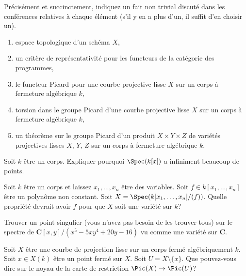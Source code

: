 \begin{exercise}[Theorems]
\label{exercise-results-spring-2025}
Précisément et succinctement, indiquez un fait non trivial discuté dans les conférences relatives
à chaque élément (s'il y en a plus d'un, il suffit d'en choisir un).
\begin{enumerate}
\item espace topologique d'un schéma $X$,
\item un critère de représentativité pour les functeurs de la catégorie des programmes,
\item le functeur Picard pour une courbe projective lisse $X$ sur un
corps à fermeture algébrique $k$,
\item torsion dans le groupe Picard d'une courbe projective lisse $X$ sur un
corps à fermeture algébrique $k$,
\item un théorème sur le groupe Picard d'un produit $X \times Y \times
Z$ de variétés projectives lisses $X$, $Y$, $Z$ sur un corps à
fermeture algébrique $k$.
\end{enumerate}
\end{exercise}

\begin{exercise}
\label{exercise-affine-line-infinite-nr-points}
Soit $k$ être un corps. Expliquer pourquoi $\Spec(k[x])$ a infiniment beaucoup de points.
\end{exercise}

\begin{exercise}
\label{exercise-hypersurface-variety}
Soit $k$ être un corps et laissez $x_1, \ldots, x_n$ être
des variables. Soit $f \in k[x_1, \ldots, x_n]$ être un polynôme
non constant. Soit $X = \Spec(k[x_1, \ldots, x_n]/(f))$. Quelle propriété
devrait avoir $f$ pour que $X$ soit une variété sur $k$?
\end{exercise}

\begin{exercise}
\label{exercise-find-singular-point}
Trouver un point singulier (vous n'avez pas besoin de les trouver
tous) sur le spectre de $\mathbf{C}[x, y]/(x^5 - 5xy^4 + 20y -
16)$ vu comme une variété sur $\mathbf{C}$.
\end{exercise}

\begin{exercise}
\label{exercise-kernel-restriction-pic-curve}
Soit $X$ être une courbe de projection lisse sur un corps fermé algébriquement
$k$. Soit $x \in X(k)$ être un point fermé sur $X$.
Soit $U = X \setminus \{x\}$. Que pouvez-vous dire sur le noyau
de la carte de restriction $\Pic(X) \to \Pic(U)$?
\end{exercise}

